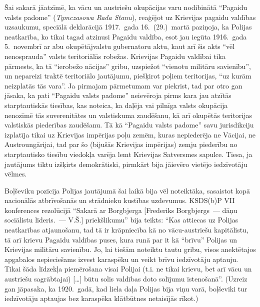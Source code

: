 \documentclass[twoside,a5paper,12pt,fleqn,openany]{extbook}
\newcommand{\pltxti}[1]{\textit{\textpolish{#1}}}
\newcommand{\citespace}{[\dots{}]}
\begin{document}
Šai sakarā jāatzīmē, ka vācu un austriešu okupācijas varu nodibinātā ``Pagaidu valsts padome'' (\pltxti{Tymczasowa Rada Stanu}), reaģējot uz Krievijas pagaidu valdības uzsaukumu, speciālā deklarācijā 1917.~gada 16.~(29.)~martā paziņoja, ka Polijas neatkarība, ko tikai tagad atzinusi Pagaidu valdība, esot jau iegūta 1916.~gada 5.~novembrī ar abu okupētājvalstu gubernatoru aktu, kaut arī šis akts ``vēl nenosprauda'' valsts teritoriālās robežas. Krievijas Pagaidu valdībai tika pārmests, ka tā ``ierobežo nācijas'' gribu, uzspiežot ``vienotu militāru savienību'', un nepareizi traktē teritoriālo jautājumu, piešķirot poļiem teritorijas, ``uz kurām neizplatās tās vara''. Ja pirmajam pārmetumam var piekrist, tad par otro gan jāsaka, ka pati ``Pagaidu valsts padome'' neievēroja pirms kara jau atzītās starptautiskās tiesības, kas noteica, ka daļēja vai pilnīga valsts okupācija nenozīmē tās suverenitātes un valstiskuma zaudēšanu, kā arī okupētās teritorijas valstiskās piederības zaudēšanu. Tā kā ``Pagaidu valsts padome'' savu jurisdikciju izplatīja tikai uz Krievijas impērijas poļu zemēm, kuras nepiederēja ne Vācijai, ne Austroungārijai, tad par šo (bijušās Krievijas impērijas) zemju piederību no starptautisko tiesību viedokļa varēja lemt Krievijas Satversmes sapulce. Tiesa, ja jautājums tiktu izšķirts demokrātiski, pirmkārt bija jāievēro vietējo iedzīvotāju vēlmes.

Boļševiku pozīcija Polijas jautājumā šai laikā bija vēl noteiktāka, sasaistot kopā nacionālās atbrīvošanās un strādnieku kustības uzdevumus. KSDS(b)P VII konferences rezolūcijā ``Sakarā ar Borgbjerga [Frederiks Borgbjergs~--- dāņu sociālistu līderis.~--- V.Š.] priekšlikumu'' bija teikts: ``Kas attiecas uz Polijas neatkarības atjaunošanu, tad tā ir krāpniecība kā no vācu-austriešu kapitālistu, tā arī krievu Pagaidu valdības puses, kura runā par it kā ``brīvu'' Polijas un Krievijas militāru savienību. Jo, lai tiešām noteiktu tautu gribu, visos anektētajos apgabalos nepieciešams izvest karaspēku un veikt brīvu iedzīvotāju aptauju. Tikai šāda līdzekļa piemērošana visai Polijai (t.i. ne tikai krievu, bet arī vācu un austriešu sagrābtajai) \citespace{} būtu solis valdības doto solījumu īstenošanā''. (Uzreiz gan jāpasaka, ka 1920.~gadā, kad liela daļa Polijas bija viņu varā, boļševiki tur iedzīvotāju aptaujas bez karaspēka klātbūtnes netaisījās rīkot.)
\end{document}
